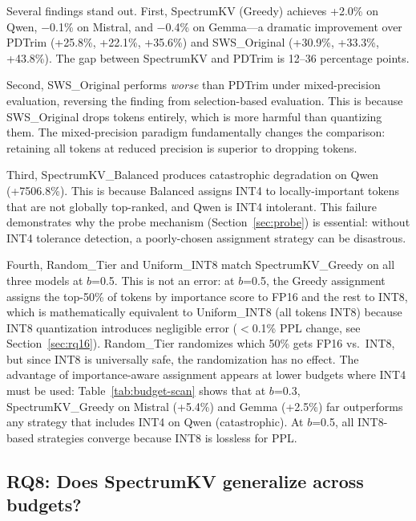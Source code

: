 \documentclass[11pt]{article}
\newcommand{\method}{SpectrumKV}
\newcommand{\pct}{\%}
\theoremstyle{definition}
\theoremstyle{plain}
\begin{document}
Several findings stand out.  First, \method{} (Greedy) achieves +2.0\pct{} on Qwen, $-$0.1\pct{} on Mistral, and $-$0.4\pct{} on Gemma---a dramatic improvement over PDTrim (+25.8\pct{}, +22.1\pct{}, +35.6\pct{}) and SWS\_Original (+30.9\pct{}, +33.3\pct{}, +43.8\pct{}).  The gap between \method{} and PDTrim is 12--36 percentage points.

Second, SWS\_Original performs \emph{worse} than PDTrim under mixed-precision evaluation, reversing the finding from selection-based evaluation.  This is because SWS\_Original drops tokens entirely, which is more harmful than quantizing them.  The mixed-precision paradigm fundamentally changes the comparison: retaining all tokens at reduced precision is superior to dropping tokens.

Third, SpectrumKV\_Balanced produces catastrophic degradation on Qwen (+7506.8\pct{}).  This is because Balanced assigns INT4 to locally-important tokens that are not globally top-ranked, and Qwen is INT4 intolerant.  This failure demonstrates why the probe mechanism (Section~\ref{sec:probe}) is essential: without INT4 tolerance detection, a poorly-chosen assignment strategy can be disastrous.

Fourth, Random\_Tier and Uniform\_INT8 match SpectrumKV\_Greedy on all three models at $b$=0.5.  This is not an error: at $b$=0.5, the Greedy assignment assigns the top-50\% of tokens by importance score to FP16 and the rest to INT8, which is mathematically equivalent to Uniform\_INT8 (all tokens INT8) because INT8 quantization introduces negligible error ($<$0.1\% PPL change, see Section~\ref{sec:rq16}).  Random\_Tier randomizes which 50\% gets FP16 vs.\ INT8, but since INT8 is universally safe, the randomization has no effect.  The advantage of importance-aware assignment appears at lower budgets where INT4 must be used: Table~\ref{tab:budget-scan} shows that at $b$=0.3, SpectrumKV\_Greedy on Mistral (+5.4\%) and Gemma (+2.5\%) far outperforms any strategy that includes INT4 on Qwen (catastrophic).  At $b$=0.5, all INT8-based strategies converge because INT8 is lossless for PPL.

\subsection{RQ8: Does SpectrumKV generalize across budgets?}
\label{sec:rq8}
\end{document}
